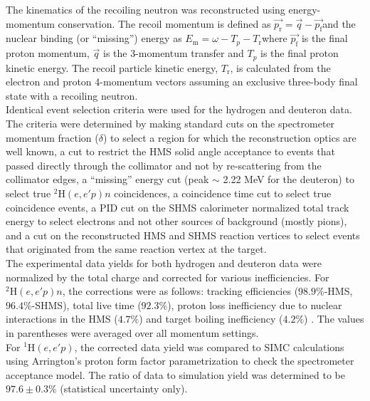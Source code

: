 \indent The kinematics of the recoiling neutron was reconstructed using energy-momentum conservation. The recoil momentum is defined as $\vec{p_{\mathrm{r}}} = \vec{q} - \vec{p_{\mathrm{f}}}$\DIFaddbegin \DIFadd{,
}\DIFaddend and the nuclear binding (or ``missing'') energy as $E_{\mathrm{m}} = \omega - T_{p} - T_{\mathrm{r}}$\DIFaddbegin \DIFadd{, }\DIFaddend where $\vec{p_{\mathrm{f}}}$ is the final proton momentum, $\vec{q}$ is the
3-momentum transfer and $T_{p}$ is the final proton kinetic energy. The recoil particle kinetic energy, $T_{\mathrm{r}}$, is calculated from the electron and proton
4-momentum vectors assuming an exclusive three-body final state with a recoiling neutron.\\
\indent Identical event selection criteria were used for the hydrogen and deuteron data. The criteria were determined by making standard cuts on the spectrometer momentum fraction ($\delta$) to select a region for which the reconstruction optics
are well known,  a cut to restrict the HMS solid angle acceptance to events that passed directly through the collimator and not by re-scattering from the collimator edges, a ``missing''
energy cut (peak $\sim$ 2.22 MeV for the deuteron) to select true $^{2}\mathrm{H}(e,e'p)n$ coincidences, a coincidence time cut to select true coincidence events, a PID cut on the
SHMS calorimeter normalized total track energy to select electrons and not other sources of background (mostly pions), and a cut on the reconstructed HMS and SHMS reaction vertices to select events that 
originated from the same reaction vertex at the target.\\
\indent The experimental data yields for both hydrogen and deuteron data were normalized by the total charge and corrected for various inefficiencies. For $^{2}\mathrm{H}(e,e'p)n$, the corrections
were as follows: tracking efficiencies ($98.9 \%$-HMS, $96.4 \%$-SHMS), total live time ($92.3 \%$), proton loss inefficiency due to nuclear interactions in the HMS ($4.7 \%$) \cite{cyero_phdthesis} and
target boiling inefficiency ($4.2 \%$) \cite{cyero_phdthesis}. The values in parentheses were averaged over all momentum settings. \\
\indent For $^{1}\mathrm{H}(e,e'p)$, the corrected data yield was compared to SIMC calculations using Arrington's proton form factor \DIFaddbegin {}\DIFaddend parametrization \cite{PhysRevC.69.022201} to check the spectrometer acceptance
model. The ratio of data to simulation yield was determined to be $97.6\pm0.3 \%$ (statistical uncertainty only).\\
